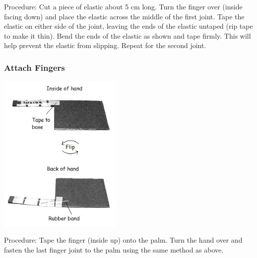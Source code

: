 \begin{multicols}{2}
\begin{description*}
\item[Procedure:]{Cut a piece of elastic about 5 cm long. Turn the finger over (inside facing down) and place the elastic across the middle of the first joint. Tape the elastic on either side of the joint, leaving the ends of the elastic untaped (rip tape to make it thin). Bend the ends of the elastic as shown and tape firmly. This will help prevent the elastic from slipping. Repeat for the second joint.}
\end{description*}

\subsubsection{Attach Fingers}

\begin{center}
\includegraphics[width=0.45\textwidth]{./img/robotic-hand-3.jpg}
\end{center}

\begin{description*}
\item[Procedure:]{Tape the finger (inside up) onto the palm. Turn the hand over and fasten the last finger joint to the palm using the same method as above.}
\end{description*}


\end{multicols}
